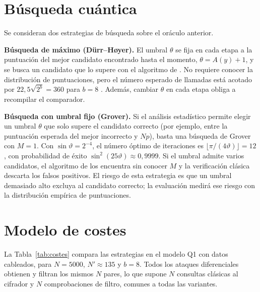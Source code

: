 \section{Búsqueda cuántica}
\label{sec:busqueda-q}

Se consideran dos estrategias de búsqueda sobre el oráculo anterior.

\textbf{Búsqueda de máximo (Dürr--Høyer).} El umbral \(\theta\) se fija en cada etapa a la puntuación del mejor candidato encontrado hasta el momento, \(\theta=A(y)+1\), y se busca un candidato que lo supere con el algoritmo de \citet{bbht1998}. No requiere conocer la distribución de puntuaciones, pero el número esperado de llamadas está acotado por \(22{,}5\sqrt{2^b}=360\) para \(b=8\) \citep{durr1996}. Además, cambiar \(\theta\) en cada etapa obliga a recompilar el comparador.

\textbf{Búsqueda con umbral fijo (Grover).} Si el análisis estadístico permite elegir un umbral \(\theta\) que solo supere el candidato correcto (por ejemplo, entre la puntuación esperada del mejor incorrecto y \(Np\)), basta una búsqueda de Grover con \(M=1\). Con \(\sin\vartheta=2^{-4}\), el número óptimo de iteraciones es \(\lfloor\pi/(4\vartheta)\rfloor=12\), con probabilidad de éxito \(\sin^2(25\vartheta)\approx 0{,}9999\). Si el umbral admite varios candidatos, el algoritmo de \citet{bbht1998} los encuentra sin conocer \(M\) y la verificación clásica descarta los falsos positivos. El riesgo de esta estrategia es que un umbral demasiado alto excluya al candidato correcto; la evaluación medirá ese riesgo con la distribución empírica de puntuaciones.

\section{Modelo de costes}
\label{sec:costes}

La Tabla~\ref{tab:costes} compara las estrategias en el modelo Q1 con datos cableados, para \(N=5000\), \(N'\approx 135\) y \(b=8\). Todos los ataques diferenciales obtienen y filtran los mismos \(N\) pares, lo que supone \(N\) consultas clásicas al cifrador y \(N\) comprobaciones de filtro, comunes a todas las variantes.

